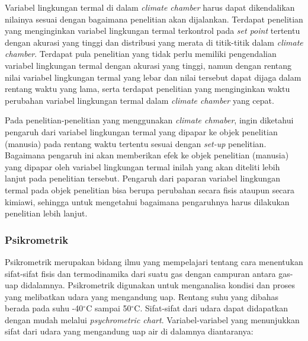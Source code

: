 Variabel lingkungan termal di dalam \textit{climate chamber} harus dapat dikendalikan nilainya sesuai dengan bagaimana penelitian akan dijalankan. Terdapat penelitian yang menginginkan variabel lingkungan termal terkontrol pada \textit{set point} tertentu dengan akurasi yang tinggi dan distribusi yang merata di titik-titik dalam \textit{climate chamber}\cite{paper31WHe}. Terdapat pula penelitian yang tidak perlu memiliki pengendalian variabel lingkungan termal dengan akurasi yang tinggi, namun dengan rentang nilai variabel lingkungan termal yang lebar dan nilai tersebut dapat dijaga dalam rentang waktu yang lama\cite{paper31APLeskinen}\cite{paper31AHuguet}\cite{paper31EJofre}\cite{paper31Srinivasa}, serta terdapat penelitian yang menginginkan waktu perubahan variabel lingkungan termal dalam \textit{climate chamber} yang cepat\cite{paper31Emartinez}.

Pada penelitian-penelitian yang menggunakan \textit{climate chmaber}, ingin diketahui pengaruh dari variabel lingkungan termal yang dipapar ke objek penelitian (manusia) pada rentang waktu tertentu sesuai dengan \textit{set-up} penelitian. Bagaimana pengaruh ini akan memberikan efek ke objek penelitian (manusia) yang dipapar oleh variabel lingkungan termal inilah yang akan diteliti lebih lanjut pada penelitian tersebut. Pengaruh dari paparan variabel lingkungan termal pada objek penelitian bisa berupa perubahan secara fisis ataupun secara kimiawi, sehingga untuk mengetahui bagaimana pengaruhnya harus dilakukan penelitian lebih lanjut.

\subsubsection{Psikrometrik}

Psikrometrik merupakan bidang ilmu yang mempelajari tentang cara menentukan sifat-sifat fisis dan termodinamika dari suatu gas dengan campuran antara gas-uap didalamnya. Psikrometrik digunakan untuk menganalisa kondisi dan proses yang melibatkan udara yang mengandung uap. Rentang suhu yang dibahas berada pada suhu -40$^\circ$C sampai 50$^\circ$C. Sifat-sifat dari udara dapat didapatkan dengan mudah melalui \textit{psychrometric chart}. Variabel-variabel yang menunjukkan sifat dari udara yang mengandung uap air di dalamnya diantaranya:\cite{skripsiIchfan}

